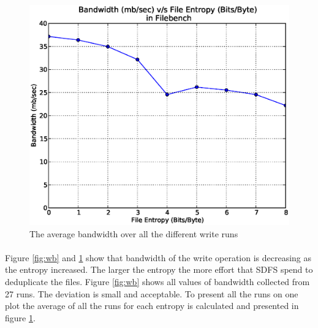 \begin{figure}[H]
\begin{center}
\includegraphics[scale=.55]{../results/set1/write_bw_avg.eps}
\caption{The average bandwidth over all the different write runs}
\label{fig:wbavg}
\end{center}
\end{figure}
\paragraph{}
Figure \ref{fig:wb} and \ref{fig:wbavg} show that bandwidth of the write operation is decreasing as the entropy increased. The larger the entropy the more effort that SDFS spend to deduplicate the files. Figure \ref{fig:wb} shows all values of bandwidth collected from 27 runs. The deviation is small and acceptable. To present all the runs on one plot the average of all the runs for each entropy is calculated and presented in figure \ref{fig:wbavg}.

